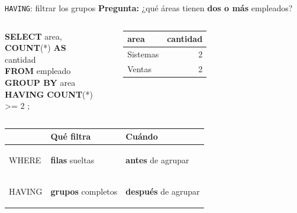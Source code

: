\documentclass[aspectratio=169,10pt,c]{beamer}
\newcommand{\kw}[1]{\textcolor{utpRojo}{\textbf{#1}}}
\newcommand{\nuevo}[1]{{%
  \setlength{\fboxsep}{1.2pt}%
  \begingroup
  \renewcommand{\kw}[1]{\textcolor{utpNegro}{\textbf{##1}}}%
  \colorbox{yellow!45}{\textcolor{utpNegro}{#1}}%
  \endgroup}}
\newenvironment{sqlcode}[1][.86\textwidth]
  {\begin{center}\begin{lrbox}{\sqlbuf}\begin{minipage}{#1}\ttfamily\footnotesize\vspace{6pt}\raggedright}
  {\vspace{6pt}\end{minipage}\end{lrbox}\colorbox{utpGrisClaro}{\usebox{\sqlbuf}}\end{center}}
\newcommand{\cab}[1]{\normalfont\bfseries #1}
\newcommand{\res}[3]{%
  \centering{\scriptsize\color{utpGris}resultado}\\[3pt]
  \footnotesize\ttfamily
  \begin{tabular}{#1}
  \toprule
  #2 \\
  \midrule
  #3
  \bottomrule
  \end{tabular}}
\begin{document}
\begin{frame}{\texttt{HAVING}: filtrar los grupos}
\small \textbf{Pregunta:} ¿qué áreas tienen \textbf{dos o más} empleados?
\vspace{0.05cm}
\begin{columns}[c,onlytextwidth]
\begin{sqlcode}[\textwidth]
\scriptsize
\kw{SELECT} area, \kw{COUNT}(*) \kw{AS} cantidad\\
\kw{FROM} empleado\\
\kw{GROUP BY} area\\
\nuevo{\kw{HAVING} \kw{COUNT}(*) >= 2};
\end{sqlcode}
\res{lr}{\cab{area} & \cab{cantidad}}{%
  Sistemas & 2 \\
  Ventas & 2 \\}
\end{columns}
\vspace{-0.05cm}
\begin{center}
\small
\renewcommand{\arraystretch}{1.1}
\begin{tabular}{>{\ttfamily\bfseries\raggedright\arraybackslash}p{1.7cm}>{\raggedright\arraybackslash}p{4.4cm}>{\raggedright\arraybackslash}p{5.8cm}}
\toprule
& \bfseries Qué filtra & \bfseries Cuándo \\
\midrule
WHERE & \textbf{filas} sueltas & \textbf{antes} de agrupar \\
HAVING & \textbf{grupos} completos & \textbf{después} de agrupar \\
\bottomrule
\end{tabular}
\end{center}
\vspace{-0.15cm}
\end{frame}
\end{document}
